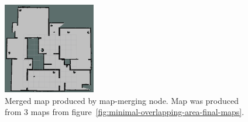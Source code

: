 \begin{figure}
    \centering
    \includegraphics[width=1.58in]{../img/minimal-overlapping-area-merged-map.png}
    \caption{Merged map produced by map-merging node. Map was produced from $3$ maps from figure~\ref{fig:minimal-overlapping-area-final-maps}.}
    \label{fig:minimal-overlapping-area-merged-map}
\end{figure}
